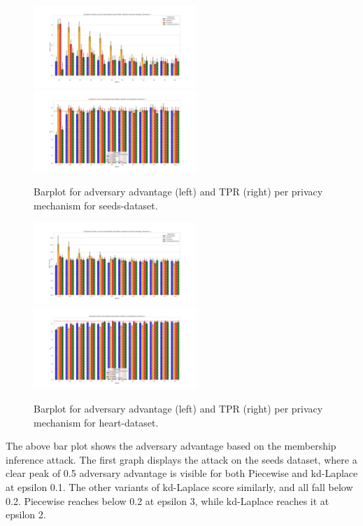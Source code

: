 \begin{figure}[H]
    \centering
    \begin{minipage}[c]{1.1\textwidth}
        \includegraphics[width=0.55\textwidth]{Results/RQ1/seeds-dataset/shokri_mi_adv_seeds-dataset_comparison.png}
        \includegraphics[width=0.55\textwidth]{Results/RQ1/seeds-dataset/tpr_seeds-dataset_comparison.png}
        \caption{Barplot for adversary advantage (left) and TPR (right) per privacy mechanism for seeds-dataset.}
        \label{fig:privacy_seeds-dataset_comparison_2d_aa_plot}
    \end{minipage}
    \begin{minipage}[c]{1.1\textwidth}
        \includegraphics[width=0.55\textwidth]{Results/RQ1/heart-dataset/shokri_mi_adv_heart-dataset_comparison.png}
        \includegraphics[width=0.55\textwidth]{Results/RQ1/heart-dataset/tpr_heart-dataset_comparison.png}
        \caption{Barplot for adversary advantage (left) and TPR (right) per privacy mechanism for heart-dataset.}
        \label{fig:privacy_heart-dataset_comparison_2d_add_plot}
    \end{minipage}
\end{figure}
The above bar plot shows the adversary advantage based on the membership inference attack. The first graph displays the attack on the seeds dataset, where a clear peak of 0.5 adversary advantage is visible for both Piecewise and kd-Laplace at epsilon 0.1. The other variants of kd-Laplace score similarly, and all fall below 0.2. Piecewise reaches below 0.2 at epsilon 3, while kd-Laplace reaches it at epsilon 2.

